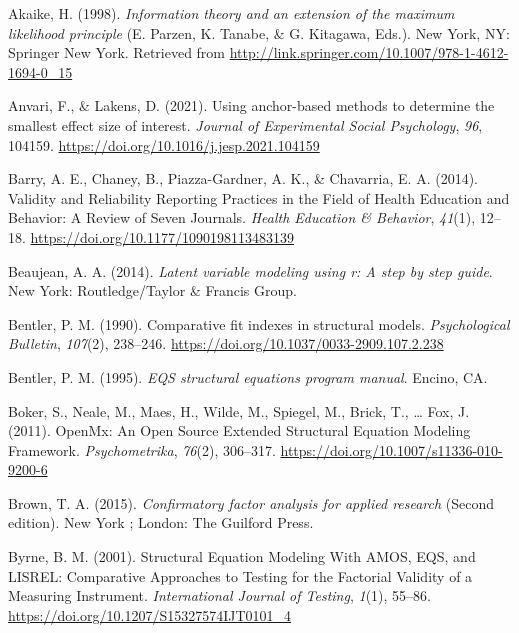 \documentclass[
  man]{apa6}
\newlength{\cslhangindent}
\newlength{\cslentryspacingunit} %
\newenvironment{CSLReferences}[2] %
 {%
  \setlength{\parindent}{0pt}
  \ifodd #1
  \let\oldpar\par
  \def\par{\hangindent=\cslhangindent\oldpar}
  \fi
  \setlength{\parskip}{#2\cslentryspacingunit}
 }%
 {}
\begin{document}
\hypertarget{refs}{}
\begin{CSLReferences}{1}{0}
\leavevmode{}%
Akaike, H. (1998). \emph{Information theory and an extension of the maximum likelihood principle} (E. Parzen, K. Tanabe, \& G. Kitagawa, Eds.). New York, NY: Springer New York. Retrieved from \url{http://link.springer.com/10.1007/978-1-4612-1694-0_15}

\leavevmode{}%
Anvari, F., \& Lakens, D. (2021). Using anchor-based methods to determine the smallest effect size of interest. \emph{Journal of Experimental Social Psychology}, \emph{96}, 104159. \url{https://doi.org/10.1016/j.jesp.2021.104159}

\leavevmode{}%
Barry, A. E., Chaney, B., Piazza-Gardner, A. K., \& Chavarria, E. A. (2014). Validity and Reliability Reporting Practices in the Field of Health Education and Behavior: A Review of Seven Journals. \emph{Health Education \& Behavior}, \emph{41}(1), 12--18. \url{https://doi.org/10.1177/1090198113483139}

\leavevmode{}%
Beaujean, A. A. (2014). \emph{Latent variable modeling using r: A step by step guide}. New York: Routledge/Taylor \& Francis Group.

\leavevmode{}%
Bentler, P. M. (1990). Comparative fit indexes in structural models. \emph{Psychological Bulletin}, \emph{107}(2), 238--246. \url{https://doi.org/10.1037/0033-2909.107.2.238}

\leavevmode{}%
Bentler, P. M. (1995). \emph{EQS structural equations program manual}. Encino, CA.

\leavevmode{}%
Boker, S., Neale, M., Maes, H., Wilde, M., Spiegel, M., Brick, T., \ldots{} Fox, J. (2011). OpenMx: An Open Source Extended Structural Equation Modeling Framework. \emph{Psychometrika}, \emph{76}(2), 306--317. \url{https://doi.org/10.1007/s11336-010-9200-6}

\leavevmode{}%
Brown, T. A. (2015). \emph{Confirmatory factor analysis for applied research} (Second edition). New York ; London: The Guilford Press.

\leavevmode{}%
Byrne, B. M. (2001). Structural Equation Modeling With AMOS, EQS, and LISREL: Comparative Approaches to Testing for the Factorial Validity of a Measuring Instrument. \emph{International Journal of Testing}, \emph{1}(1), 55--86. \url{https://doi.org/10.1207/S15327574IJT0101_4}


\end{CSLReferences}
\end{document}
